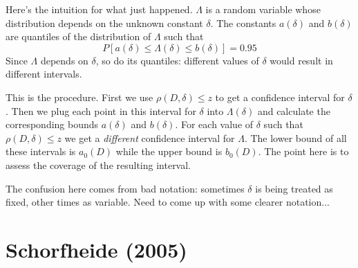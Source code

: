\documentclass[12pt]{article}
\theoremstyle{definition}
\begin{document}
Here's the intuition for what just happened. $\Lambda$ is a random variable whose distribution depends on the unknown constant $\delta$. The constants $a(\delta)$ and $b(\delta)$ are quantiles of the distribution of $\Lambda$ such that 
	$$P\left[a(\delta) \leq \Lambda(\delta) \leq b(\delta)\right] = 0.95$$
Since $\Lambda$ depends on $\delta$, so do its quantiles: different values of $\delta$ would result in different intervals. 

This is the procedure. First we use $\rho(D,\delta)\leq z$ to get a confidence interval for $\delta$. Then we plug each point in this interval for $\delta$ into $\Lambda(\delta)$ and calculate the corresponding bounds $a(\delta)$ and $b(\delta)$. For each value of $\delta$ such that $\rho(D,\delta)\leq z$ we get a \emph{different} confidence interval for $\Lambda$. The lower bound of all these intervals is $a_0(D)$ while the upper bound is $b_0(D)$. The point here is to assess the coverage of the resulting interval.

The confusion here comes from bad notation: sometimes $\delta$ is being treated as fixed, other times as variable. Need to come up with some clearer notation...














\section{Schorfheide (2005)}
\end{document}
